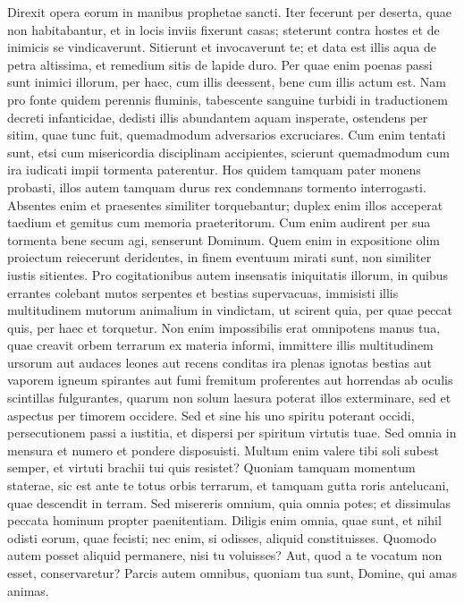 \begin{biblechapter}
\begin{biblechapter}
\begin{biblechapter}
\begin{biblechapter}
\begin{biblechapter}
\begin{biblechapter}
\begin{biblechapter}
\begin{biblechapter}
\begin{biblechapter}
\begin{biblechapter}
\begin{biblechapter}
\verse Direxit opera eorum
 in manibus prophetae sancti.
 \verse Iter fecerunt per deserta, quae non habitabantur,
 et in locis inviis fixerunt casas;
 \verse steterunt contra hostes
 et de inimicis se vindicaverunt.
 \verse Sitierunt et invocaverunt te;
 et data est illis aqua de petra altissima,
 et remedium sitis de lapide duro.
 \verse Per quae enim poenas passi sunt inimici illorum,
 per haec, cum illis deessent, bene cum illis actum est.
 \verse Nam pro fonte quidem perennis fluminis,
 tabescente sanguine turbidi
 \verse in traductionem decreti infanticidae,
 dedisti illis abundantem aquam insperate,
 \verse ostendens per sitim, quae tunc fuit,
 quemadmodum adversarios excruciares.
 \verse Cum enim tentati sunt,
 etsi cum misericordia disciplinam accipientes,
 scierunt quemadmodum cum ira iudicati
 impii tormenta paterentur.
 \verse Hos quidem tamquam pater monens probasti,
 illos autem tamquam durus rex condemnans tormento interrogasti.
 \verse Absentes enim et praesentes similiter torquebantur;
 \verse duplex enim illos acceperat taedium
 et gemitus cum memoria praeteritorum.
 \verse Cum enim audirent per sua tormenta
 bene secum agi,
 senserunt Dominum.
 \verse Quem enim in expositione olim proiectum reiecerunt deridentes, in finem eventuum mirati sunt,
 non similiter iustis sitientes.
 \verse Pro cogitationibus autem insensatis iniquitatis illorum,
 in quibus errantes colebant mutos serpentes et bestias supervacuas,
 immisisti illis multitudinem mutorum animalium in vindictam,
 \verse ut scirent quia, per quae peccat quis, per haec et torquetur.
 \verse Non enim impossibilis erat omnipotens manus tua,
 quae creavit orbem terrarum ex materia informi,
 immittere illis multitudinem ursorum aut audaces leones
 \verse aut recens conditas ira plenas ignotas bestias
 aut vaporem igneum spirantes
 aut fumi fremitum proferentes
 aut horrendas ab oculis scintillas fulgurantes,
 \verse quarum non solum laesura poterat illos exterminare,
 sed et aspectus per timorem occidere.
 \verse Sed et sine his uno spiritu poterant occidi,
 persecutionem passi a iustitia,
 et dispersi per spiritum virtutis tuae.
 Sed omnia in mensura et numero et pondere disposuisti.
 \verse Multum enim valere tibi soli subest semper,
 et virtuti brachii tui quis resistet?
 \verse Quoniam tamquam momentum staterae,
 sic est ante te totus orbis terrarum,
 et tamquam gutta roris antelucani, quae descendit in terram.
 \verse Sed misereris omnium, quia omnia potes;
 et dissimulas peccata hominum propter paenitentiam.
 \verse Diligis enim omnia, quae sunt,
 et nihil odisti eorum, quae fecisti;
 nec enim, si odisses, aliquid constituisses.
 \verse Quomodo autem posset aliquid permanere, nisi tu voluisses?
 Aut, quod a te vocatum non esset, conservaretur?
 \verse Parcis autem omnibus, quoniam tua sunt,
 Domine, qui amas animas.
 

\end{biblechapter}
\end{biblechapter}
\end{biblechapter}
\end{biblechapter}
\end{biblechapter}
\end{biblechapter}
\end{biblechapter}
\end{biblechapter}
\end{biblechapter}
\end{biblechapter}
\end{biblechapter}
